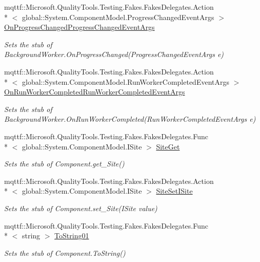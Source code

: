 \begin{DoxyCompactItemize}
mqttf\-::\-Microsoft.\-Quality\-Tools.\-Testing.\-Fakes.\-Fakes\-Delegates.\-Action\\*
$<$ global\-::\-System.\-Component\-Model.\-Progress\-Changed\-Event\-Args $>$ \hyperlink{class_system_1_1_component_model_1_1_fakes_1_1_stub_background_worker_afad859d58b9874fe82c3cb00f5d7cfba}{On\-Progress\-Changed\-Progress\-Changed\-Event\-Args}
\begin{DoxyCompactList}\small\item\em Sets the stub of Background\-Worker.\-On\-Progress\-Changed(\-Progress\-Changed\-Event\-Args e)\end{DoxyCompactList}\item 
mqttf\-::\-Microsoft.\-Quality\-Tools.\-Testing.\-Fakes.\-Fakes\-Delegates.\-Action\\*
$<$ global\-::\-System.\-Component\-Model.\-Run\-Worker\-Completed\-Event\-Args $>$ \hyperlink{class_system_1_1_component_model_1_1_fakes_1_1_stub_background_worker_a2b543b8874a6f34729d202ca948785b9}{On\-Run\-Worker\-Completed\-Run\-Worker\-Completed\-Event\-Args}
\begin{DoxyCompactList}\small\item\em Sets the stub of Background\-Worker.\-On\-Run\-Worker\-Completed(\-Run\-Worker\-Completed\-Event\-Args e)\end{DoxyCompactList}\item 
mqttf\-::\-Microsoft.\-Quality\-Tools.\-Testing.\-Fakes.\-Fakes\-Delegates.\-Func\\*
$<$ global\-::\-System.\-Component\-Model.\-I\-Site $>$ \hyperlink{class_system_1_1_component_model_1_1_fakes_1_1_stub_background_worker_a66cf24129f03c49087642f576ced9a9e}{Site\-Get}
\begin{DoxyCompactList}\small\item\em Sets the stub of Component.\-get\-\_\-\-Site()\end{DoxyCompactList}\item 
mqttf\-::\-Microsoft.\-Quality\-Tools.\-Testing.\-Fakes.\-Fakes\-Delegates.\-Action\\*
$<$ global\-::\-System.\-Component\-Model.\-I\-Site $>$ \hyperlink{class_system_1_1_component_model_1_1_fakes_1_1_stub_background_worker_a4c9d05712af98b2ce0414a684fce7c51}{Site\-Set\-I\-Site}
\begin{DoxyCompactList}\small\item\em Sets the stub of Component.\-set\-\_\-\-Site(\-I\-Site value)\end{DoxyCompactList}\item 
mqttf\-::\-Microsoft.\-Quality\-Tools.\-Testing.\-Fakes.\-Fakes\-Delegates.\-Func\\*
$<$ string $>$ \hyperlink{class_system_1_1_component_model_1_1_fakes_1_1_stub_background_worker_aad05ec233b50ccf0b524b682419ef697}{To\-String01}
\begin{DoxyCompactList}\small\item\em Sets the stub of Component.\-To\-String()\end{DoxyCompactList}\end{DoxyCompactItemize}
